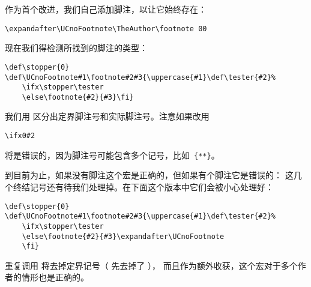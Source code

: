 \documentclass{book}
\begin{document}
作为首个改进，我们自己添加脚注，以让它始终存在： 
\begin{verbatim}
\expandafter\UCnoFootnote\TheAuthor\footnote 00
\end{verbatim}
现在我们得检测所找到的脚注的类型：
\begin{verbatim}
\def\stopper{0}
\def\UCnoFootnote#1\footnote#2#3{\uppercase{#1}\def\tester{#2}%
    \ifx\stopper\tester
    \else\footnote{#2}{#3}\fi}
\end{verbatim}
我们用  区分出定界脚注号和实际脚注号。注意如果改用
\begin{verbatim}
\ifx0#2
\end{verbatim}
将是错误的，因为脚注号可能包含多个记号，比如~\verb>{**}>。

到目前为止，如果没有脚注这个宏是正确的，但如果有个脚注它是错误的：
这几个终结记号还有待我们处理掉。在下面这个版本中它们会被小心处理好：
\begin{verbatim}
\def\stopper{0}
\def\UCnoFootnote#1\footnote#2#3{\uppercase{#1}\def\tester{#2}%
    \ifx\stopper\tester
    \else\footnote{#2}{#3}\expandafter\UCnoFootnote
    \fi}
\end{verbatim}
重复调用  将去掉定界记号（ 先去掉了 ），
而且作为额外收获，这个宏对于多个作者的情形也是正确的。
\end{document}
